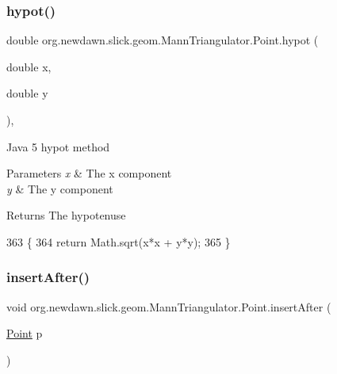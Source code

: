 \subsubsection{\texorpdfstring{hypot()}{hypot()}}
{\footnotesize\ttfamily double org.\+newdawn.\+slick.\+geom.\+Mann\+Triangulator.\+Point.\+hypot (\begin{DoxyParamCaption}\item[{double}]{x,  }\item[{double}]{y }\end{DoxyParamCaption})\hspace{0.3cm}{\ttfamily [inline]}, {\ttfamily [private]}}

Java 5 hypot method


\begin{DoxyParams}{Parameters}
{\em x} & The x component \\
\hline
{\em y} & The y component \\
\hline
\end{DoxyParams}
\begin{DoxyReturn}{Returns}
The hypotenuse 
\end{DoxyReturn}

\begin{DoxyCode}
363                                                  \{
364             \textcolor{keywordflow}{return} Math.sqrt(x*x + y*y);
365         \}
\end{DoxyCode}
\mbox{\label{classorg_1_1newdawn_1_1slick_1_1geom_1_1_mann_triangulator_1_1_point_a5e973d8a1a5afd94b86a5f5e779b7daf}} 
\subsubsection{\texorpdfstring{insert\+After()}{insertAfter()}}
{\footnotesize\ttfamily void org.\+newdawn.\+slick.\+geom.\+Mann\+Triangulator.\+Point.\+insert\+After (\begin{DoxyParamCaption}\item[{\mbox{\hyperlink{classorg_1_1newdawn_1_1slick_1_1geom_1_1_mann_triangulator_1_1_point}{Point}}}]{p }\end{DoxyParamCaption})\hspace{0.3cm}{\ttfamily [inline]}}

